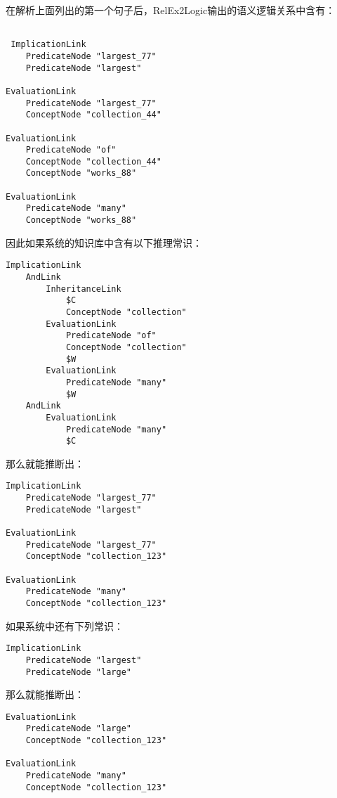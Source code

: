 在解析上面列出的第一个句子后，RelEx2Logic输出的语义逻辑关系中含有：

 {\tt\begin{small}\begin{lstlisting}
 
 ImplicationLink
 	PredicateNode "largest_77"
	PredicateNode "largest"
 
EvaluationLink
	PredicateNode "largest_77"
	ConceptNode "collection_44"
	
EvaluationLink
	PredicateNode "of"
	ConceptNode "collection_44"
	ConceptNode "works_88"
	
EvaluationLink
	PredicateNode "many"
	ConceptNode "works_88"
\end{lstlisting}\end{small}}

\noindent 因此如果系统的知识库中含有以下推理常识：

{\tt\begin{small}\begin{lstlisting}
ImplicationLink
	AndLink
		InheritanceLink
			$C
			ConceptNode "collection"
		EvaluationLink
			PredicateNode "of"
			ConceptNode "collection"
			$W
		EvaluationLink
			PredicateNode "many"
			$W
	AndLink
		EvaluationLink
			PredicateNode "many"
			$C
 \end{lstlisting}\end{small}}

\noindent 那么就能推断出：

 {\tt\begin{small}\begin{lstlisting}
ImplicationLink
 	PredicateNode "largest_77"
	PredicateNode "largest"
 
EvaluationLink
	PredicateNode "largest_77"
	ConceptNode "collection_123"
	
EvaluationLink
	PredicateNode "many"
	ConceptNode "collection_123"
\end{lstlisting}\end{small}}

\noindent 如果系统中还有下列常识：

 {\tt\begin{small}\begin{lstlisting}
ImplicationLink
	PredicateNode "largest"
	PredicateNode "large"
\end{lstlisting}\end{small}}

\noindent 那么就能推断出：

 {\tt\begin{small}\begin{lstlisting}
EvaluationLink
	PredicateNode "large"
	ConceptNode "collection_123"
	
EvaluationLink
	PredicateNode "many"
	ConceptNode "collection_123"
\end{lstlisting}\end{small}}

